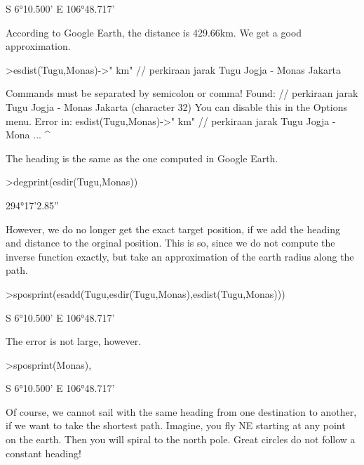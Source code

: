 \documentclass[a4paper,10pt]{article}
\begin{document}
\begin{eulernotebook}
\begin{eulercomment}
\begin{eulercomment}
\begin{eulercomment}
\begin{eulercomment}
\begin{eulercomment}
\begin{eulercomment}
\begin{euleroutput}
  S 6°10.500' E 106°48.717'
\end{euleroutput}
\begin{eulercomment}
According to Google Earth, the distance is 429.66km. We get a good
approximation.
\end{eulercomment}
\begin{eulerprompt}
>esdist(Tugu,Monas)->" km" // perkiraan jarak Tugu Jogja - Monas Jakarta
\end{eulerprompt}
\begin{euleroutput}
  Commands must be separated by semicolon or comma!
  Found:  // perkiraan jarak Tugu Jogja - Monas Jakarta (character 32)
  You can disable this in the Options menu.
  Error in:
  esdist(Tugu,Monas)->" km" // perkiraan jarak Tugu Jogja - Mona ...
                           ^
\end{euleroutput}
\begin{eulercomment}
The heading is the same as the one computed in Google Earth.
\end{eulercomment}
\begin{eulerprompt}
>degprint(esdir(Tugu,Monas))
\end{eulerprompt}
\begin{euleroutput}
  294°17'2.85''
\end{euleroutput}
\begin{eulercomment}
However, we do no longer get the exact target position, if we add the
heading and distance to the orginal position. This is so, since we do
not compute the inverse function exactly, but take an approximation of
the earth radius along the path.
\end{eulercomment}
\begin{eulerprompt}
>sposprint(esadd(Tugu,esdir(Tugu,Monas),esdist(Tugu,Monas)))
\end{eulerprompt}
\begin{euleroutput}
  S 6°10.500' E 106°48.717'
\end{euleroutput}
\begin{eulercomment}
The error is not large, however.
\end{eulercomment}
\begin{eulerprompt}
>sposprint(Monas),
\end{eulerprompt}
\begin{euleroutput}
  S 6°10.500' E 106°48.717'
\end{euleroutput}
\begin{eulercomment}
Of course, we cannot sail with the same heading from one destination
to another, if we want to take the shortest path. Imagine, you fly NE
starting at any point on the earth. Then you will spiral to the north
pole. Great circles do not follow a constant heading!


\end{eulercomment}
\end{eulercomment}
\end{eulercomment}
\end{eulercomment}
\end{eulercomment}
\end{eulercomment}
\end{eulercomment}
\end{eulernotebook}
\end{document}

